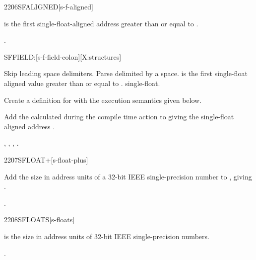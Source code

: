 \begin{worddef}{2206}{SFALIGNED}[s-f-aligned]
\item {}

	 is the first single-float-aligned address greater
	than or equal to .

\see {}.
\end{worddef}


\begin{worddef}{}{SFFIELD:}[s-f-field-colon][X:structures]
\item {}

	Skip leading space delimiters. Parse  delimited by
	a space.  is the first single-float aligned value
	greater than or equal to .  
	single-float.

	Create a definition for  with the execution semantics
	given below.

\execute[name] 

	Add the  calculated during the compile time action
	to  giving the single-float aligned address
	.

\see {},
	,
	, \linebreak
	.
\end{worddef}


\begin{worddef}{2207}{SFLOAT+}[s-float-plus]
\item {}

	Add the size in address units of a 32-bit IEEE single-precision
	number to , giving .

\see {}.
\end{worddef}


\begin{worddef}{2208}{SFLOATS}[s-floats]
\item {}

	 is the size in address units of  32-bit IEEE
	single-precision numbers.

\see {}.
\end{worddef}
